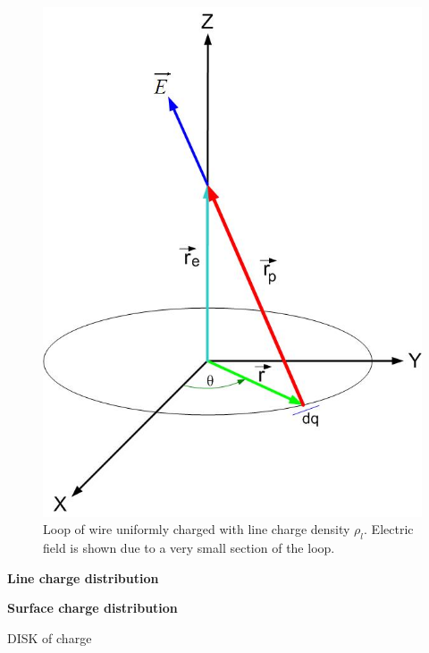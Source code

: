 \documentclass{ximera}
\begin{document}
\begin{figure}[htbp]
\begin{center}
\includegraphics[scale=0.5]{../jpg/chargedistribution.jpg}
\end{center}
\caption{Loop of wire uniformly charged with line charge density $\rho_l$. Electric field is shown due to a very small section of the loop.}
\label{linecharge}
\end{figure}








{\bf Line charge distribution}


{\bf Surface charge distribution}


DISK of charge
\end{document}

